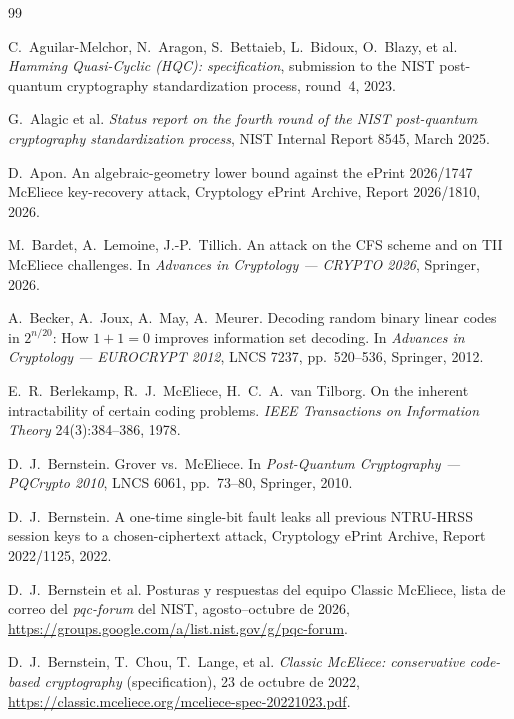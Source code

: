 
\begin{thebibliography}{99}
\raggedright

C.~Aguilar-Melchor, N.~Aragon, S.~Bettaieb, L.~Bidoux, O.~Blazy,
et al. \emph{Hamming Quasi-Cyclic (HQC): specification}, submission
to the NIST post-quantum cryptography standardization process,
round~4, 2023.

G.~Alagic et al. \emph{Status report on the fourth round of the NIST
post-quantum cryptography standardization process}, NIST Internal
Report 8545, March 2025.

D.~Apon. An algebraic-geometry lower bound against the ePrint
2026/1747 McEliece key-recovery attack, Cryptology ePrint Archive,
Report 2026/1810, 2026.

M.~Bardet, A.~Lemoine, J.-P.~Tillich. An attack on the CFS scheme
and on TII McEliece challenges. In \emph{Advances in Cryptology ---
CRYPTO 2026}, Springer, 2026.

A.~Becker, A.~Joux, A.~May, A.~Meurer. Decoding random binary linear
codes in $2^{n/20}$: How $1+1=0$ improves information set decoding.
In \emph{Advances in Cryptology --- EUROCRYPT 2012}, LNCS 7237,
pp.~520--536, Springer, 2012.

E.~R.~Berlekamp, R.~J.~McEliece, H.~C.~A.~van Tilborg. On the
inherent intractability of certain coding problems. \emph{IEEE
Transactions on Information Theory} 24(3):384--386, 1978.

D.~J.~Bernstein. Grover vs.\ McEliece. In \emph{Post-Quantum
Cryptography --- PQCrypto 2010}, LNCS 6061, pp.~73--80, Springer,
2010.

D.~J.~Bernstein. A one-time single-bit fault leaks all previous
NTRU-HRSS session keys to a chosen-ciphertext attack, Cryptology
ePrint Archive, Report 2022/1125, 2022.

D.~J.~Bernstein et al. Posturas y respuestas del equipo Classic
McEliece, lista de correo del \emph{pqc-forum} del NIST, agosto--octubre
de 2026, \url{https://groups.google.com/a/list.nist.gov/g/pqc-forum}.

D.~J.~Bernstein, T.~Chou, T.~Lange, et al. \emph{Classic McEliece:
conservative code-based cryptography} (specification), 23 de octubre
de 2022, \url{https://classic.mceliece.org/mceliece-spec-20221023.pdf}.


\end{thebibliography}
